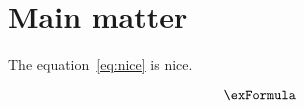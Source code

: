 \section{Main matter}

The equation~\ref{eq:nice} is nice.

\begin{equation}
  \exFormula \label{eq:nice}
\end{equation}
